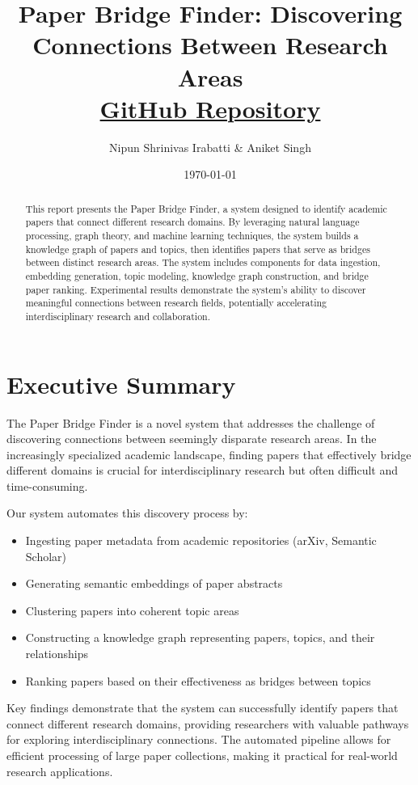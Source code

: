 \documentclass[11pt,a4paper]{article}
\title{Paper Bridge Finder: Discovering Connections Between Research Areas\\
\large\href{https://github.com/Cero72/Paper-Bridge}{GitHub Repository}}
\author{Nipun Shrinivas Irabatti \& Aniket Singh}
\date{\today}
\begin{document}
\maketitle

\begin{abstract}
This report presents the Paper Bridge Finder, a system designed to identify academic papers that connect different research domains. By leveraging natural language processing, graph theory, and machine learning techniques, the system builds a knowledge graph of papers and topics, then identifies papers that serve as bridges between distinct research areas. The system includes components for data ingestion, embedding generation, topic modeling, knowledge graph construction, and bridge paper ranking. Experimental results demonstrate the system's ability to discover meaningful connections between research fields, potentially accelerating interdisciplinary research and collaboration.
\end{abstract}

\tableofcontents
\newpage

\section{Executive Summary}

The Paper Bridge Finder is a novel system that addresses the challenge of discovering connections between seemingly disparate research areas. In the increasingly specialized academic landscape, finding papers that effectively bridge different domains is crucial for interdisciplinary research but often difficult and time-consuming.

Our system automates this discovery process by:
\begin{itemize}
    \item Ingesting paper metadata from academic repositories (arXiv, Semantic Scholar)
    \item Generating semantic embeddings of paper abstracts
    \item Clustering papers into coherent topic areas
    \item Constructing a knowledge graph representing papers, topics, and their relationships
    \item Ranking papers based on their effectiveness as bridges between topics
\end{itemize}

Key findings demonstrate that the system can successfully identify papers that connect different research domains, providing researchers with valuable pathways for exploring interdisciplinary connections. The automated pipeline allows for efficient processing of large paper collections, making it practical for real-world research applications.
\end{document}
